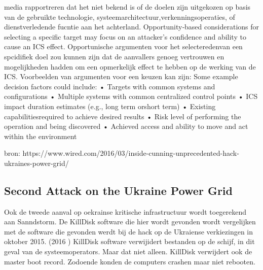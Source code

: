 {media rapportreren dat het niet bekend is of de doelen zijn uitgekozen op basis van de gebruikte
technologie, systeemarchitectuur,verkenningsoperaties, of dienstverledende fucntie aan het
achterland.
Opportunity‐based considerations for selecting a specific target may focus on an attacker’s
confidence and ability to cause an ICS effect. Opportunische argumenten voor het selecteredenvan
een spcidifiek doel zou kunnen zijn dat de aanvallers genoeg vertrouwen en mogelijkheden hadden
om een opmerkelijk effect te hebben op de werking van de ICS.
Voorbeelden van argumenten voor een keuzen kan zijn:
Some example decision factors could include:
• Targets with common systems and configurations
• Multiple systems with common centralized control points
• ICS impact duration estimates (e.g., long term orshort term)
• Existing capabilitiesrequired to achieve desired results
• Risk level of performing the operation and being discovered
• Achieved access and ability to move and act within the environment

bron: https://www.wired.com/2016/03/inside-cunning-unprecedented-hack-ukraines-power-grid/

\subsection{Second Attack on the Ukraine Power Grid}


Ook de tweede aanval op oekrainse kritische infrastructuur wordt toegerekend aan Sanndstorm. De
KillDisk software die hier wordt gevonden wordt vergelijken met de software die gevonden werdt bij
de hack op de Ukraiense verkiezingen in oktober 2015. (2016 ) KillDisk software verwijidert
bestanden op de schijf, in dit geval van de systeemoperators. Maar dat niet alleen. KillDisk verwijdert
ook de master boot record. Zodoende konden de computers crashen maar niet rebooten.

}
